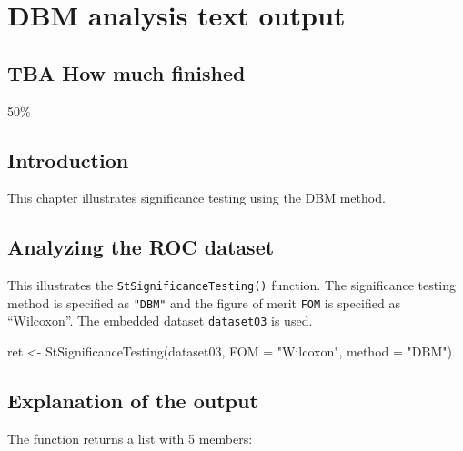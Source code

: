 \documentclass[
]{book}
\newenvironment{Shaded}{\begin{snugshade}}{\end{snugshade}}
\newcommand{\AttributeTok}[1]{\textcolor[rgb]{0.77,0.63,0.00}{#1}}
\newcommand{\FunctionTok}[1]{\textcolor[rgb]{0.00,0.00,0.00}{#1}}
\newcommand{\NormalTok}[1]{#1}
\newcommand{\OtherTok}[1]{\textcolor[rgb]{0.56,0.35,0.01}{#1}}
\newcommand{\StringTok}[1]{\textcolor[rgb]{0.31,0.60,0.02}{#1}}
\begin{document}
\hypertarget{quick-start-dbm-text}{%
\chapter{DBM analysis text output}\label{quick-start-dbm-text}}

\hypertarget{quick-start-dbm-text-how-much-finished}{%
\section{TBA How much finished}\label{quick-start-dbm-text-how-much-finished}}

50\%

\hypertarget{quick-start-dbm-text-intro}{%
\section{Introduction}\label{quick-start-dbm-text-intro}}

This chapter illustrates significance testing using the DBM method.

\hypertarget{quick-start-dbm-text-analyze-dataset}{%
\section{Analyzing the ROC dataset}\label{quick-start-dbm-text-analyze-dataset}}

This illustrates the \texttt{StSignificanceTesting()} function. The significance testing method is specified as \texttt{"DBM"} and the figure of merit \texttt{FOM} is specified as ``Wilcoxon''. The embedded dataset \texttt{dataset03} is used.

\begin{Shaded}
\begin{Highlighting}[]
\NormalTok{ret }\OtherTok{\textless{}{-}} \FunctionTok{StSignificanceTesting}\NormalTok{(dataset03, }\AttributeTok{FOM =} \StringTok{"Wilcoxon"}\NormalTok{, }\AttributeTok{method =} \StringTok{"DBM"}\NormalTok{)}
\end{Highlighting}
\end{Shaded}

\hypertarget{quick-start-dbm-text-explanation}{%
\section{Explanation of the output}\label{quick-start-dbm-text-explanation}}

The function returns a list with 5 members:
\end{document}
